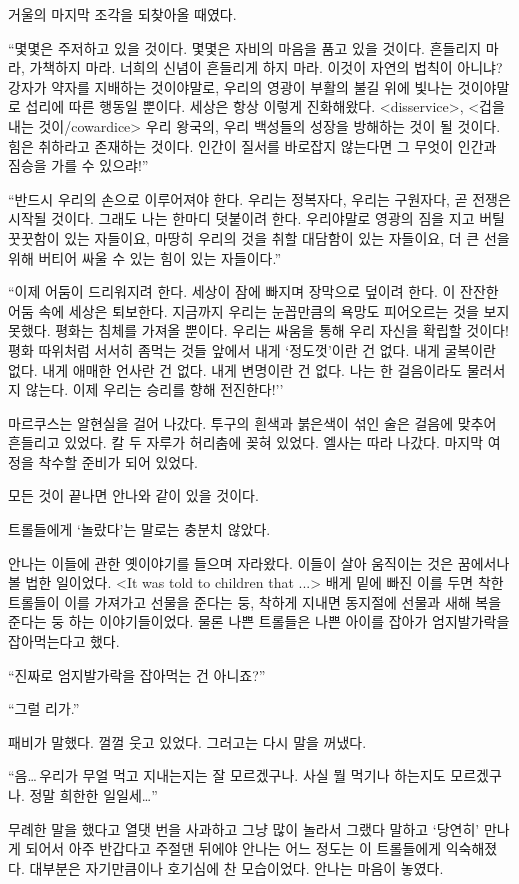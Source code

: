 거울의 마지막 조각을 되찾아올 때였다.

``몇몇은 주저하고 있을 것이다. 몇몇은 자비의 마음을 품고 있을 것이다. 흔들리지 마라, 가책하지 마라. 너희의 신념이 흔들리게 하지 마라. 이것이 자연의 법칙이 아니냐? 강자가 약자를 지배하는 것이야말로, 우리의 영광이 부활의 불길 위에 빛나는 것이야말로 섭리에 따른 행동일 뿐이다. 세상은 항상 이렇게 진화해왔다. <disservice>, <겁을 내는 것이/cowardice> 우리 왕국의, 우리 백성들의 성장을 방해하는 것이 될 것이다. 힘은 취하라고 존재하는 것이다. 인간이 질서를 바로잡지 않는다면 그 무엇이 인간과 짐승을 가를 수 있으랴!''

``반드시 우리의 손으로 이루어져야 한다. 우리는 정복자다, 우리는 구원자다, 곧 전쟁은 시작될 것이다. 그래도 나는 한마디 덧붙이려 한다. 우리야말로 영광의 짐을 지고 버틸 꿋꿋함이 있는 자들이요, 마땅히 우리의 것을 취할 대담함이 있는 자들이요, 더 큰 선을 위해 버티어 싸울 수 있는 힘이 있는 자들이다.''

``이제 어둠이 드리워지려 한다. 세상이 잠에 빠지며 장막으로 덮이려 한다. 이 잔잔한 어둠 속에 세상은 퇴보한다. 지금까지 우리는 눈꼽만큼의 욕망도 피어오르는 것을 보지 못했다. 평화는 침체를 가져올 뿐이다. 우리는 싸움을 통해 우리 자신을 확립할 것이다! 평화 따위처럼 서서히 좀먹는 것들 앞에서 내게 `정도껏'이란 건 없다. 내게 굴복이란 없다. 내게 애매한 언사란 건 없다. 내게 변명이란 건 없다. 나는 한 걸음이라도 물러서지 않는다. 이제 우리는 승리를 향해 전진한다!''

마르쿠스는 알현실을 걸어 나갔다. 투구의 흰색과 붉은색이 섞인 술은 걸음에 맞추어 흔들리고 있었다. 칼 두 자루가 허리춤에 꽂혀 있었다. 엘사는 따라 나갔다. 마지막 여정을 착수할 준비가 되어 있었다.

모든 것이 끝나면 안나와 같이 있을 것이다.

\textbreak

트롤들에게 `놀랐다'는 말로는 충분치 않았다.

안나는 이들에 관한 옛이야기를 들으며 자라왔다. 이들이 살아 움직이는 것은 꿈에서나 볼 법한 일이었다. <It was told to children that ...> 배게 밑에 빠진 이를 두면 착한 트롤들이 이를 가져가고 선물을 준다는 둥, 착하게 지내면 동지절에 선물과 새해 복을 준다는 둥 하는 이야기들이었다. 물론 나쁜 트롤들은 나쁜 아이를 잡아가 엄지발가락을 잡아먹는다고 했다.

``진짜로 엄지발가락을 잡아먹는 건 아니죠?''

``그럴 리가.''

패비가 말했다. 껄껄 웃고 있었다. 그러고는 다시 말을 꺼냈다.

``음\ldots\,우리가 무얼 먹고 지내는지는 잘 모르겠구나. 사실 뭘 먹기나 하는지도 모르겠구나. 정말 희한한 일일세\ldots''

무례한 말을 했다고 열댓 번을 사과하고 그냥 많이 놀라서 그랬다 말하고 `당연히' 만나게 되어서 아주 반갑다고 주절댄 뒤에야 안나는 어느 정도는 이 트롤들에게 익숙해졌다. 대부분은 자기만큼이나 호기심에 찬 모습이었다. 안나는 마음이 놓였다.

